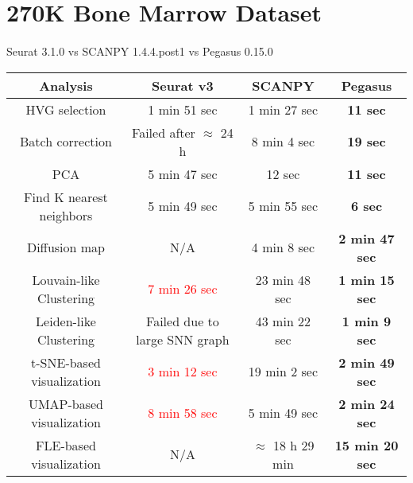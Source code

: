 \documentclass[10pt]{article}
\begin{document}
\section{270K Bone Marrow Dataset}

\paragraph{}
Seurat 3.1.0 \qquad vs \qquad SCANPY 1.4.4.post1 \qquad vs \qquad Pegasus 0.15.0

\begin{table}[H]
	\centering
	\begin{tabular}{|c|c|c|c|}
		\hline
		Analysis & Seurat v3 & SCANPY & Pegasus\\
		\hline \hline
		HVG selection & 1 min 51 sec & 1 min 27 sec & \textbf{11 sec} \\
		\hline
		Batch correction & Failed after $\approx$ 24 h & 8 min 4 sec & \textbf{19 sec} \\
		\hline
		PCA & 5 min 47 sec & 12 sec & \textbf{11 sec} \\
		\hline
		Find K nearest neighbors &  5 min 49 sec &  5 min 55 sec & \textbf{6 sec}\\
		\hline
		Diffusion map & N/A & 4 min 8 sec & \textbf{2 min 47 sec} \\
		\hline
		Louvain-like Clustering & \textcolor{red}{7 min 26 sec} & 23 min 48 sec & \textbf{1 min 15 sec} \\
		\hline 
		Leiden-like Clustering & Failed due to large SNN graph & 43 min 22 sec & \textbf{1 min 9 sec}\\
		\hline
		t-SNE-based visualization & \textcolor{red}{3 min 12 sec} & 19 min 2 sec & \textbf{2 min 49 sec}\\
		\hline
		UMAP-based visualization & \textcolor{red}{8 min 58 sec} & 5 min 49 sec  & \textbf{2 min 24 sec}\\
		\hline
		FLE-based visualization & N/A & $\approx$ 18 h 29 min & \textbf{15 min 20 sec}\\
		\hline
	\end{tabular}
\end{table}
\end{document}

